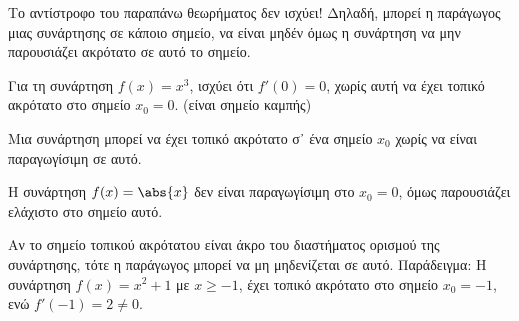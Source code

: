 \begin{rem}
\item {}
  \begin{myitemize}
    \item Το αντίστροφο του παραπάνω θεωρήματος δεν ισχύει! Δηλαδή, μπορεί η 
      παράγωγος μιας συνάρτησης σε κάποιο σημείο, να είναι μηδέν όμως η συνάρτηση να 
      μην παρουσιάζει ακρότατο σε αυτό το σημείο. 
      \begin{example}
      Για τη συνάρτηση $ f(x)=x^{3} $, ισχύει ότι $ f'(0)=0 $, χωρίς αυτή να έχει τοπικό 
      ακρότατο στο σημείο $ x_{0}=0 $. (είναι σημείο καμπής)

      \end{example}

    \item Μια συνάρτηση μπορεί να έχει τοπικό ακρότατο σ᾽ ένα σημείο $ x_{0} $ χωρίς 
      να είναι παραγωγίσιμη σε αυτό.  
      \begin{example}
      Η συνάρτηση $ f(x)= \abs{x} $ δεν είναι παραγωγίσιμη στο $ x_{0}=0 $, 
      όμως παρουσιάζει ελάχιστο στο σημείο αυτό.

      \end{example}

    \item Αν το σημείο τοπικού ακρότατου είναι άκρο του διαστήματος ορισμού της 
      συνάρτησης, τότε η παράγωγος μπορεί να μη μηδενίζεται σε αυτό. Παράδειγμα: Η 
      συνάρτηση $ f(x) = x^{2}+1 $ με $ x \geq -1 $, έχει τοπικό ακρότατο στο σημείο 
      $ x_{0}=-1 $, ενώ $ f'(-1)=2 \neq 0 $.
  \end{myitemize}
\end{rem}

